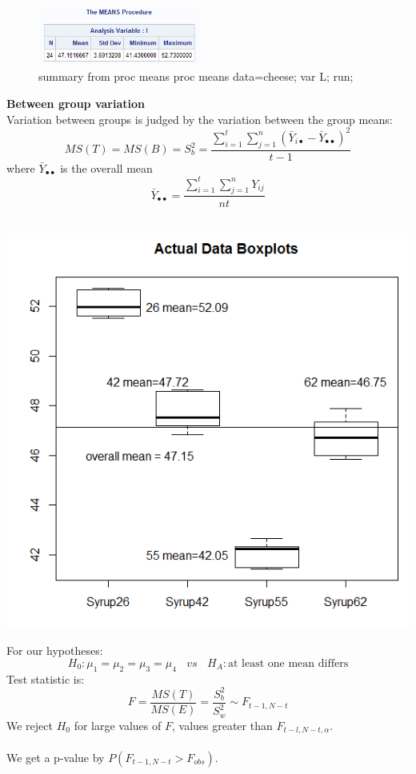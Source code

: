 \begin{figure}
	\begin{center}
		\includegraphics[width=0.48\textwidth]{colorsum}
  \end{center}
  \caption{summary from proc means
	proc means data=cheese;
var L; run;}
\end{figure}

\large \textbf{Between group variation} \normalsize\\
Variation between groups is judged by the variation between the group means:
$$MS(T) = MS(B) = S^2_b = \frac{\sum_{i=1}^{t}\sum_{j=1}^{n}(\bar{Y}_{i\bullet}-\bar{Y}_{\bullet\bullet})^2}{t-1}$$
where $\bar{Y}_{\bullet\bullet}$ is the overall mean 
$$\bar{Y}_{\bullet\bullet}=\frac{\sum_{i=1}^{t}\sum_{j=1}^{n}Y_{ij}}{nt}$$
~\\
\begin{flushright}
\includegraphics[scale=0.7]{colorboxplot}
\end{flushright}

For our hypotheses:
$$H_0: \mu_1=\mu_2=\mu_3=\mu_4~~~~vs~~~~H_A:\mbox{at least one mean differs}$$
Test statistic is:
$$F=\frac{MS(T)}{MS(E)}=\frac{S^2_b}{S^2_w}\sim F_{t-1,N-t}$$
We reject $H_0$ for large values of $F$, values greater than $F_{t-l,N-t,\alpha}$.\\~\\
We get a p-value by $P(F_{t-1,N-t}>F_{obs})$.

